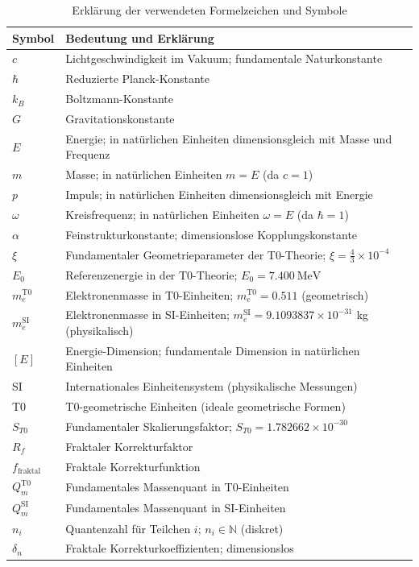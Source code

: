 	\begin{table}[h]
		\centering
		\begin{tabular}{p{3cm}p{10cm}}
			\toprule
			\textbf{Symbol} & \textbf{Bedeutung und Erklärung} \\
			\midrule
			$c$ & Lichtgeschwindigkeit im Vakuum; fundamentale Naturkonstante \\
			$\hbar$ & Reduzierte Planck-Konstante \\
			$k_B$ & Boltzmann-Konstante \\
			$G$ & Gravitationskonstante \\
			$E$ & Energie; in natürlichen Einheiten dimensionsgleich mit Masse und Frequenz \\
			$m$ & Masse; in natürlichen Einheiten $m = E$ (da $c=1$) \\
			$p$ & Impuls; in natürlichen Einheiten dimensionsgleich mit Energie \\
			$\omega$ & Kreisfrequenz; in natürlichen Einheiten $\omega = E$ (da $\hbar=1$) \\
			$\alpha$ & Feinstrukturkonstante; dimensionslose Kopplungskonstante \\
			$\xi$ & Fundamentaler Geometrieparameter der T0-Theorie; $\xi = \frac{4}{3} \times 10^{-4}$ \\
			$E_0$ & Referenzenergie in der T0-Theorie; $E_0 = 7.400~\mathrm{MeV}$ \\
			$m_e^{\mathrm{T0}}$ & Elektronenmasse in T0-Einheiten; $m_e^{\mathrm{T0}} = 0.511$ (geometrisch) \\
			$m_e^{\mathrm{SI}}$ & Elektronenmasse in SI-Einheiten; $m_e^{\mathrm{SI}} = 9.1093837\times 10^{-31}$ kg (physikalisch) \\
			$[E]$ & Energie-Dimension; fundamentale Dimension in natürlichen Einheiten \\
			SI & Internationales Einheitensystem (physikalische Messungen) \\
			T0 & T0-geometrische Einheiten (ideale geometrische Formen) \\
			$S_{T0}$ & Fundamentaler Skalierungsfaktor; $S_{T0} = 1.782662 \times 10^{-30}$ \\
			$R_f$ & Fraktaler Korrekturfaktor \\
			$f_{\text{fraktal}}$ & Fraktale Korrekturfunktion \\
			$Q_m^{\mathrm{T0}}$ & Fundamentales Massenquant in T0-Einheiten \\
			$Q_m^{\mathrm{SI}}$ & Fundamentales Massenquant in SI-Einheiten \\
			$n_i$ & Quantenzahl für Teilchen $i$; $n_i \in \mathbb{N}$ (diskret) \\
			$\delta_n$ & Fraktale Korrekturkoeffizienten; dimensionslos \\
			\bottomrule
		\end{tabular}
		\caption{Erklärung der verwendeten Formelzeichen und Symbole}
	\end{table}
	
